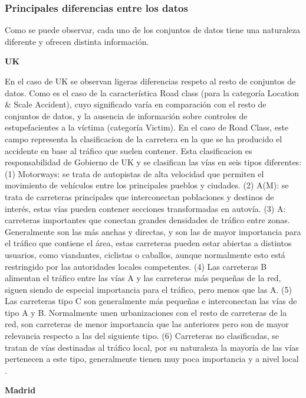 \documentclass{uathesis-es}
\begin{document}
\subsubsection{Principales diferencias entre los datos}

Como se puede observar, cada uno de los conjuntos de datos tiene una naturaleza diferente y ofrecen distinta información.

\textbf{UK}

En el caso de UK se observan ligeras diferencias respeto al resto de conjuntos de datos. Como es el caso de la característica Road class (para la categoría Location \& Scale Accident), cuyo significado varía en comparación con el resto de conjuntos de datos, y la ausencia de información sobre controles de estupefacientes a la víctima (categoría Victim). En el caso de Road Class, este campo representa la clasificacion de la carretera en la que se ha producido el accidente en base al tráfico que suelen contener. Esta clasificacion es responsabilidad de Gobierno de UK y se clasifican las vías en seis tipos diferentes: (1) Motorways: se trata de autopistas de alta velocidad que permiten el movimiento de vehículos entre los principales pueblos y ciudades. (2) A(M): se trata de carreteras principales que interconectan poblaciones y destinos de interés, estas vías pueden contener secciones transformadas en autovía. (3) A: carreteras importantes que conectan grandes densidades de tráfico entre zonas. Generalmente son las más anchas y directas, y son las de mayor importancia para el tráfico que contiene el área, estas carreteras pueden estar abiertas a distintos usuarios, como viandantes, ciclistas o caballos, aunque normalmente esto está restringido por las autoridades locales competentes. (4) Las carreteras B alimentan el tráfico entre las vías A y las carreteras más pequeñas de la red, siguen siendo de especial importancia para el tráfico, pero menos que las A. (5) Las carreteras tipo C son generalmente más pequeñas e interconectan las vías de tipo A y B. Normalmente unen urbanizaciones con el resto de carreteras de la red, son carreteras de menor importancia que las anteriores pero son de mayor relevancia respecto a las del siguiente tipo. (6) Carreteras no clasificadas, se tratan de vías destinadas al tráfico local, por su naturaleza la mayoría de las vías pertenecen a este tipo, generalmente tienen muy poca importancia y a nivel local \cite{UKDepartmentForTransportRoadClassification}.


\textbf{Madrid}
\end{document}
